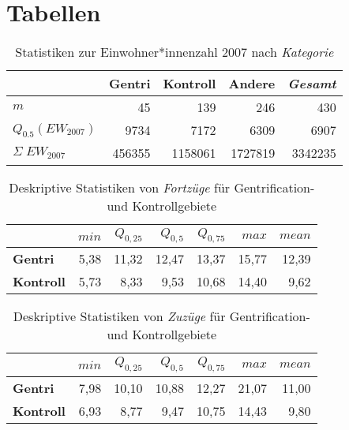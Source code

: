 \newpage
\section{Tabellen}

\begin{table}[h]
\centering
\begin{tabular}{@{}lrrrr@{}}
\toprule
                                       & \multicolumn{1}{r}{{\bf Gentri}} & \multicolumn{1}{r}{{\bf Kontroll}} & \multicolumn{1}{r}{{\bf Andere}} & \multicolumn{1}{r}{{\bf \textit{Gesamt}}} \\ \midrule
$m$                                    & 45                               & 139                                & 246                              & 430                                  \\
$Q_{0.5}(EW_{2007})$                   & 9734                             & 7172                               & 6309                             & 6907                                 \\
$\Sigma\;EW_{2007}$                    & 456355                           & 1158061                            & 1727819                          & 3342235                              \\ \bottomrule
\end{tabular}
\caption{Statistiken zur Einwohner*innenzahl 2007 nach \textit{Kategorie}}\label{tab:KategorieEW}
\end{table}            

\begin{table}[h]
\centering
\begin{tabular}{@{}lrrrrrr@{}}
\toprule
               & $min$ & $Q_{0,25}$ & $Q_{0,5}$ & $Q_{0,75}$ & $max$ & $mean$ \\ \midrule
{\bf Gentri}   & 5,38 & 11,32 & 12,47 & 13,37 & 15,77 & 12,39 \\
{\bf Kontroll} & 5,73 &  8,33 &  9,53 & 10,68 & 14,40 & 9,62 \\ \bottomrule
\end{tabular}
\caption{Deskriptive Statistiken von \textit{Fortzüge} für Gentrification- und Kontrollgebiete}
\label{tab:FortzuegeR}
\end{table}

\begin{table}[h]
\centering
\begin{tabular}{@{}lrrrrrr@{}}
\toprule
               & $min$ & $Q_{0,25}$ & $Q_{0,5}$ & $Q_{0,75}$ & $max$ & $mean$ \\ \midrule
{\bf Gentri}   & 7,98 & 10,10 & 10,88 & 12,27 & 21,07 & 11,00 \\
{\bf Kontroll} & 6,93 & 8,77 & 9,47 & 10,75 & 14,43 &  9,80  \\ \bottomrule
\end{tabular}
\caption{Deskriptive Statistiken von \textit{Zuzüge} für Gentrification- und Kontrollgebiete}
\label{tab:ZuzuegeR}
\end{table}

